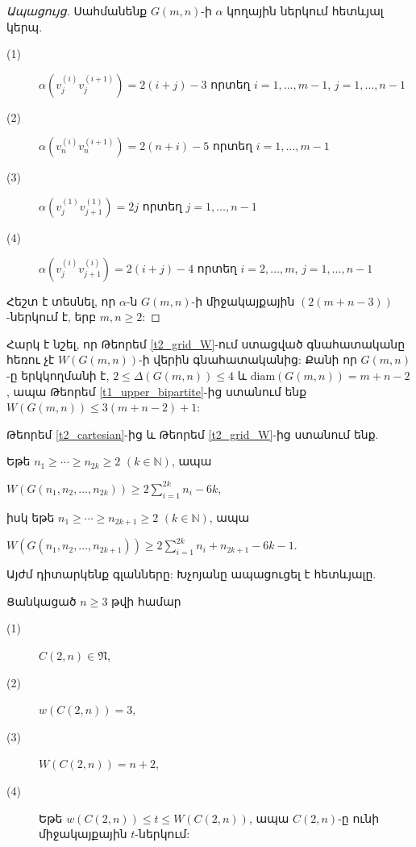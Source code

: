 \begin{proof}[Ապացույց]
Սահմանենք $G(m,n)$-ի $\alpha$ կողային ներկում հետևյալ կերպ.
\begin{description}
\item[(1)] 
$\alpha\left(v_{j}^{(i)}v_{j}^{(i+1)}\right)=2(i+j)-3$ 
որտեղ $i=1,\ldots,m-1$, $j=1,\ldots,n-1$

\item[(2)] 
$\alpha\left(v_{n}^{(i)}v_{n}^{(i+1)}\right)=2(n+i)-5$
որտեղ $i=1,\ldots,m-1$

\item[(3)] 
$\alpha\left(v_{j}^{(1)}v_{j+1}^{(1)}\right)=2j$
որտեղ $j=1,\ldots,n-1$

\item[(4)] 
$\alpha\left(v_{j}^{(i)}v_{j+1}^{(i)}\right)=2(i+j)-4$
 որտեղ $i=2,\ldots,m$, $j=1,\ldots,n-1$
\end{description}

Հեշտ է տեսնել, որ $\alpha$-ն $G(m,n)$-ի միջակայքային $(2(m+n-3))$-ներկում է, երբ $m,n\geq 2$:
\end{proof}

Հարկ է նշել, որ Թեորեմ \ref{t2_grid_W}-ում ստացված գնահատականը հեռու չէ $W\left(G(m,n)\right)$-ի վերին գնահատականից: Քանի որ $G(m,n)$-ը երկկողմանի է, $2\leq \Delta\left(G(m,n)\right)\leq 4$ և
$\mathrm{diam}\left(G(m,n)\right)=m+n-2$, ապա Թեորեմ \ref{t1_upper_bipartite}-ից ստանում ենք $W\left(G(m,n)\right)\leq 3(m+n-2)+1$:

Թեորեմ \ref{t2_cartesian}-ից և Թեորեմ \ref{t2_grid_W}-ից ստանում ենք.

\begin{corollary}
\label{t2_n_grid_W} Եթե $n_{1}\geq\cdots \geq n_{2k}\geq 2$ $(k\in \mathbb{N})$, ապա
\begin{center}
$W(G(n_{1},n_{2},\ldots,n_{2k}))\geq 2\sum_{i=1}^{2k}n_{i}-6k$,
\end{center}
իսկ եթե $n_{1}\geq\cdots \geq n_{2k+1}\geq 2$ $(k\in \mathbb{N})$, ապա
\begin{center}
$W(G(n_{1},n_{2},\ldots,n_{2k+1}))\geq
2\sum_{i=1}^{2k}n_{i}+n_{2k+1}-6k-1$.
\end{center}
\end{corollary}

\bigskip

Այժմ դիտարկենք գլանները: Խչոյանը \cite{Kchoyan2010} ապացուցել է հետևյալը.

\begin{theorem}
\label{t2_Khchoyan} Ցանկացած $n\geq 3$ թվի համար
\begin{description}
\item[(1)] $C(2,n)\in \mathfrak{N}$,

\item[(2)] $w\left(C(2,n)\right)=3$,

\item[(3)] $W\left(C(2,n)\right)=n+2$,

\item[(4)] Եթե $w\left(C(2,n)\right)\leq t\leq W\left(C(2,n)\right)$, ապա $C(2,n)$-ը ունի միջակայքային $t$-ներկում:
\end{description}
\end{theorem}

